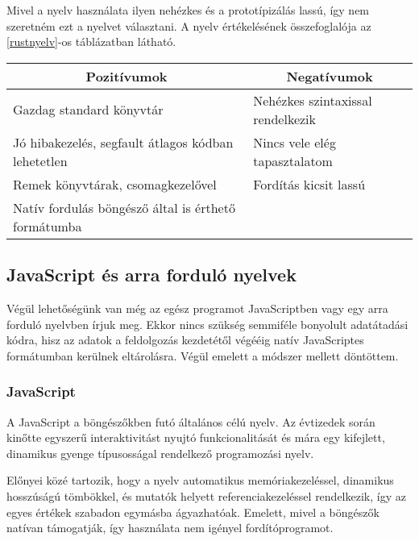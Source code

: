 Mivel a nyelv használata ilyen nehézkes és a prototípizálás lassú, így nem szeretném ezt a nyelvet választani. A nyelv értékelésének összefoglalója az \ref{rustnyelv}-os táblázatban látható.

\begin{center}
  \begin{tabularx}{\textwidth}{X X}
    \hline
    \multicolumn{1}{c}{\bfseries{Pozitívumok}}         & \multicolumn{1}{c}{\bfseries{Negatívumok}} \\
    \hline
    Gazdag standard könyvtár                           & Nehézkes szintaxissal rendelkezik          \\
    Jó hibakezelés, segfault átlagos kódban lehetetlen & Nincs vele elég tapasztalatom              \\
    Remek könyvtárak, csomagkezelővel                  & Fordítás kicsit lassú                      \\
    Natív fordulás böngésző által is érthető formátumba                                             \\
    \hline
  \end{tabularx}
\end{center}

\subsection{JavaScript és arra forduló nyelvek}

Végül lehetőségünk van még az egész programot JavaScriptben vagy egy arra forduló nyelvben írjuk meg. Ekkor nincs szükség semmiféle bonyolult adatátadási kódra, hisz az adatok a feldolgozás kezdetétől végééig natív JavaScriptes formátumban kerülnek eltárolásra. Végül emelett a módszer mellett döntöttem.

\subsubsection{JavaScript}

A JavaScript a böngészőkben futó általános célú nyelv. Az évtizedek során kinőtte egyszerű interaktivitást nyujtó funkcionalitását és mára egy kifejlett, dinamikus gyenge típusosságal rendelkező programozási nyelv.

Előnyei közé tartozik, hogy a nyelv automatikus memóriakezeléssel, dinamikus hosszúságú tömbökkel, és mutatók helyett referenciakezeléssel rendelkezik, így az egyes értékek szabadon egymásba ágyazhatóak. Emelett, mivel a böngészők natívan támogatják, így használata nem igényel fordítóprogramot.

